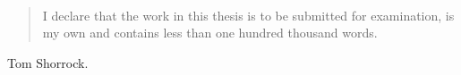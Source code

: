 
\mbox{  }
\vspace{0.4 \textheight}

\begin{quote}
I declare that the work in this thesis is to be submitted for examination, is my own and contains less than one hundred thousand words.
\end{quote}
\vspace{4cm}
\hfill 
Tom Shorrock.


